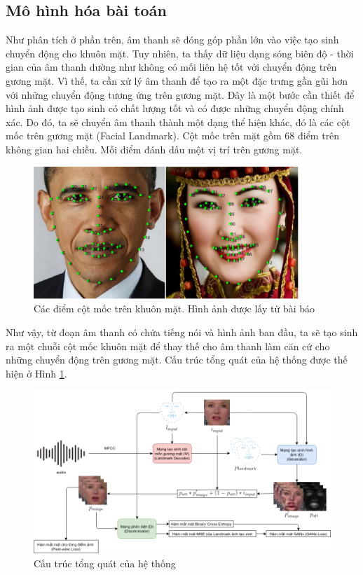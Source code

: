 \subsection{Mô hình hóa bài toán}\label{sec:modeling}

Như phân tích ở phần trên, âm thanh sẽ đóng góp phần lớn vào việc tạo sinh chuyển động cho khuôn mặt. Tuy nhiên, ta thấy dữ liệu dạng sóng biên độ - thời gian của âm thanh dường như không có mối liên hệ tốt với chuyển động trên gương mặt. Vì thế, ta cần xử lý âm thanh để tạo ra một đặc trưng gần gũi hơn với những chuyển động tương ứng trên gương mặt. Đây là một bước cần thiết để hình ảnh được tạo sinh có chất lượng tốt và có được những chuyển động chính xác. Do đó, ta sẽ chuyển âm thanh thành một dạng thể hiện khác, đó là các cột mốc trên gương mặt (Facial Landmark). Cột mốc trên mặt gồm 68 điểm trên không gian hai chiều. Mỗi điểm đánh dấu một vị trí trên gương mặt.

\begin{figure}[H]
    \centering
    \includegraphics[width=10cm]{./content/materials/landmark_intro.png}
    \caption{Các điểm cột mốc trên khuôn mặt. Hình ảnh được lấy từ bài báo \cite{landmark}}
\end{figure}

Như vậy, từ đoạn âm thanh có chứa tiếng nói và hình ảnh ban đầu, ta sẽ tạo sinh ra một chuỗi cột mốc khuôn mặt để thay thế cho âm thanh làm căn cứ cho những chuyển động trên gương mặt. Cấu trúc tổng quát của hệ thống được thế hiện ở Hình \ref{fig:common_architecture}.

\begin{figure}[H]
    \centering
    \includegraphics[width=15cm]{./content/materials/common_architecture.png}
    \caption{Cấu trúc tổng quát của hệ thống}
    \label{fig:common_architecture}
\end{figure}

